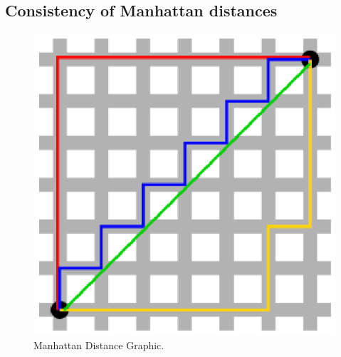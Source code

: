 \documentclass[titlepage]{article}
\begin{document}
    \subsection{Consistency of Manhattan distances}
        \begin{figure}[h]
            \centering
            \includegraphics[scale = 0.7, trim = 0mm 0mm 0mm 0mm ]{Manhattan_distance.eps} %
            \caption{Manhattan Distance Graphic.}\footnotemark
            \label{fig:taxicab}
        \end{figure}
        
\end{document}
